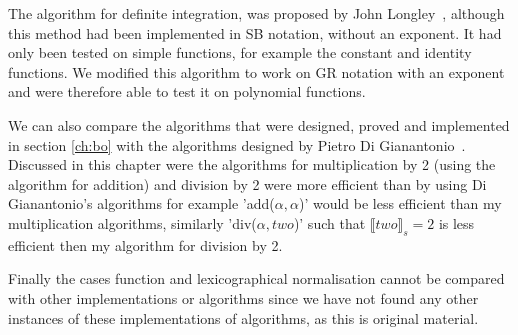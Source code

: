 \documentclass{cs4rep}
\begin{document}
The algorithm for definite integration, was proposed by John
Longley~\cite{kn:Longley}, although this method had been implemented in
SB notation, without an exponent. It had only been tested on simple
functions, for example the constant and identity functions. We
modified this algorithm to work on GR notation with an exponent and
were therefore able to test it on polynomial functions.

We can also compare the algorithms that were designed, proved and
implemented in section \ref{ch:bo} with the algorithms designed by
Pietro Di Gianantonio~\cite{kn:DiGianantonio}.  Discussed in this
chapter were the algorithms for multiplication by 2 (using the
algorithm for addition) and division by 2 were more efficient than by
using Di Gianantonio's algorithms for example 'add($\alpha,\alpha$)'
would be less efficient than my multiplication algorithms, similarly
'div($\alpha,two$)' such that $ \llbracket two \rrbracket_{s} = 2$ is
less efficient then my algorithm for division by 2.

Finally the cases function and lexicographical normalisation cannot be
compared with other implementations or algorithms since we have not
found any other instances of these implementations of algorithms, as
this is original material.
\end{document}
